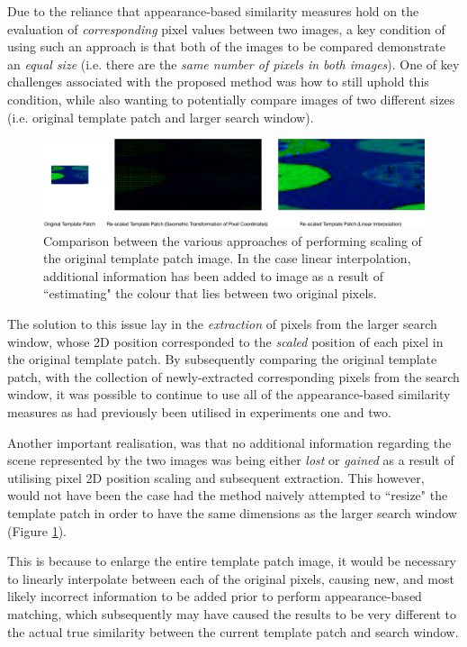 Due to the reliance that appearance-based similarity measures hold on the evaluation of \textit{corresponding} pixel values between two images, a key condition of using such an approach is that both of the images to be compared demonstrate an \textit{equal size} (i.e. there are the \textit{same number of pixels in both images}). One of key challenges associated with the proposed method was how to still uphold this condition, while also wanting to potentially compare images of two different sizes (i.e. original template patch and larger search window). 

\begin{figure}[ht!]
\centering
\includegraphics[scale=0.4]{images/scaling_types.pdf}
  \caption{Comparison between the various approaches of performing scaling of the original template patch image. In the case linear interpolation, additional information has been added to image as a result of ``estimating" the colour that lies between two original pixels. }
\label{fig:scaletypes}
\end{figure} 

The solution to this issue lay in the \textit{extraction} of pixels from the larger search window, whose 2D position corresponded to the \textit{scaled} position of each pixel in the original template patch. By subsequently comparing the original template patch, with the collection of newly-extracted corresponding pixels from the search window, it was possible to continue to use all of the appearance-based similarity measures as had previously been utilised in experiments one and two. 

Another important realisation, was that no additional information regarding the scene represented by the two images was being either \textit{lost} or \textit{gained} as a result of utilising pixel 2D position scaling and subsequent extraction. This however, would not have been the case had the method naively attempted to ``resize" the template patch in order to have the same dimensions as the larger search window (Figure \ref{fig:scaletypes}). 

This is because to enlarge the entire template patch image, it would be necessary to linearly interpolate between each of the original pixels, causing new, and most likely incorrect information to be added prior to perform appearance-based matching, which subsequently may have caused the results to be very different to the actual true similarity between the current template patch and search window.


